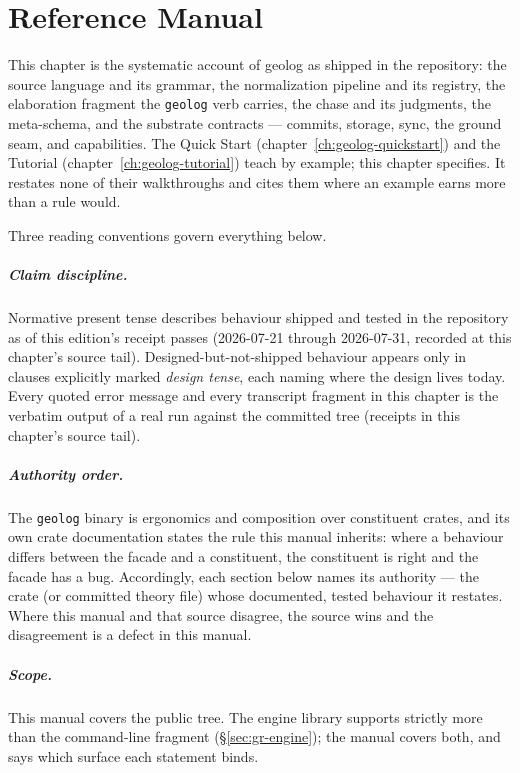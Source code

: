 \chapter{Reference Manual}
\label{ch:geolog-reference}

\noindent\draftmark\medskip

This chapter is the systematic account of geolog as shipped in the
 repository: the source language and its grammar,
the normalization pipeline and its registry, the elaboration fragment
the \texttt{geolog} verb carries, the chase and its judgments, the
meta-schema, and the substrate contracts — commits, storage, sync,
the ground seam, and capabilities. The Quick Start
(chapter~\ref{ch:geolog-quickstart}) and the Tutorial
(chapter~\ref{ch:geolog-tutorial}) teach by example; this chapter
specifies. It restates none of their walkthroughs and cites them
where an example earns more than a rule would.

Three reading conventions govern everything below.

\paragraph{Claim discipline.} Normative present tense describes
behaviour shipped and tested in the repository as of this edition's
receipt passes (2026-07-21 through 2026-07-31, recorded at this
chapter's source tail). Designed-but-not-shipped behaviour appears only in
clauses explicitly marked \emph{design tense}, each naming where the
design lives today. Every quoted error message and every transcript
fragment in this chapter is the verbatim output of a real run against
the committed tree (receipts in this chapter's source tail).

\paragraph{Authority order.} The \texttt{geolog} binary is
ergonomics and composition over constituent crates, and its own crate
documentation states the rule this manual inherits: where a behaviour
differs between the facade and a constituent, the constituent is
right and the facade has a bug. Accordingly, each section below names
its authority — the crate (or committed theory file) whose documented,
tested behaviour it restates. Where this manual and that source
disagree, the source wins and the disagreement is a defect in this
manual.

\paragraph{Scope.} This manual covers the public
 tree. The engine library supports strictly more
than the command-line fragment (\S\ref{sec:gr-engine}); the manual
covers both, and says which surface each statement binds.

